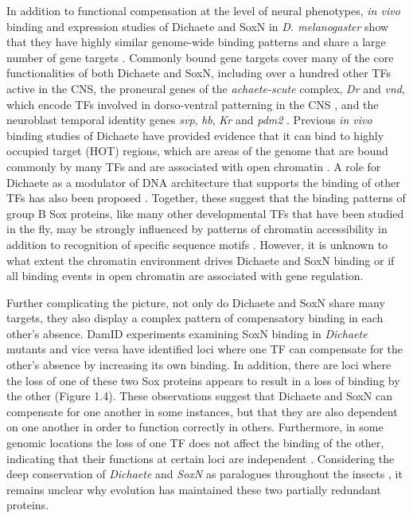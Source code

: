 In addition to functional compensation at the level of neural phenotypes, \emph{in vivo} binding and expression studies of Dichaete and SoxN in \emph{D. melanogaster} show that they have highly similar genome-wide binding patterns and share a large number of gene targets \citep{aleksic_role_2013,ferrero_soxneuro_2014}. Commonly bound gene targets cover many of the core functionalities of both Dichaete and SoxN, including over a hundred other TFs active in the CNS, the proneural genes of the \emph{achaete-scute} complex, \emph{Dr} and \emph{vnd}, which encode TFs involved in dorso-ventral patterning in the CNS \citep{zhao_genetic_2007}, and the neuroblast temporal identity genes \emph{svp}, \emph{hb}, \emph{Kr} and \emph{pdm2} \citep{ferrero_soxneuro_2014,isshiki_drosophila_2001,maurange_brainy_2005}. Previous \emph{in vivo} binding studies of Dichaete have provided evidence that it can bind to highly occupied target (HOT) regions, which are areas of the genome that are bound commonly by many TFs and are associated with open chromatin \citep{aleksic_role_2013,kvon_hot_2012}. A role for Dichaete as a modulator of DNA architecture that supports the binding of other TFs has also been proposed \citep{russell_dichaete_1996}. Together, these suggest that the binding patterns of group B Sox proteins, like many other developmental TFs that have been studied in the fly, may be strongly influenced by patterns of chromatin accessibility in addition to recognition of specific sequence motifs \citep{ferrero_soxneuro_2014,macarthur_developmental_2009}. However, it is unknown to what extent the chromatin environment drives Dichaete and SoxN binding or if all binding events in open chromatin are associated with gene regulation.

Further complicating the picture, not only do Dichaete and SoxN share many targets, they also display a complex pattern of compensatory binding in each other's absence. DamID experiments examining SoxN binding in \emph{Dichaete} mutants and vice versa have identified loci where one TF can compensate for the other's absence by increasing its own binding. In addition, there are loci where the loss of one of these two Sox proteins appears to result in a loss of binding by the other (Figure 1.4). These observations suggest that Dichaete and SoxN can compensate for one another in some instances, but that they are also dependent on one another in order to function correctly in others. Furthermore, in some genomic locations the loss of one TF does not affect the binding of the other, indicating that their functions at certain loci are independent \citep{ferrero_soxneuro_2014}. Considering the deep conservation of \emph{Dichaete} and \emph{SoxN} as paralogues throughout the insects \citep{mckimmie_conserved_2005,wilson_evolution_2008}, it remains unclear why evolution has maintained these two partially redundant proteins. 

